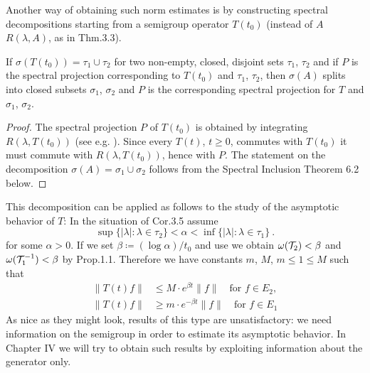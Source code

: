 Another way of obtaining such norm estimates is by constructing spectral decompositions starting from a semigroup operator $T(t_{0})$ (instead of $A$ \resp $R(\lambda,A)$, as in Thm.3.3).
\begin{corollary}\label{cor:a3-3.5}
If $\sigma(T(t_{0})) = \tau_{1} \cup \tau_{2}$ for two non-empty, closed, disjoint sets $\tau_{1}$, $\tau_{2}$ and if $P$ is the spectral projection corresponding to $T(t_{0})$ and $\tau_{1}$, $\tau_{2}$, then $\sigma(A)$ splits into closed subsets $\sigma_{1}$, $\sigma_{2}$ and $P$ is the corresponding spectral projection for $T$ and $\sigma_{1}$, $\sigma_{2}$.
\end{corollary}
\begin{proof}
The spectral projection $P$ of $T(t_{0})$ is obtained by integrating $R(\lambda,T(t_{0}))$ (see e.g. \citet[Section VII.3]{dunfordschwartz:1958}).
Since every $T(t)$, $t \geq 0$, commutes with $T(t_{0})$ it must commute with $R(\lambda,T(t_{0}))$, hence with $P$.
The statement on the decomposition $\sigma(A) = \sigma_{1} \cup \sigma_{2}$ follows from the Spectral Inclusion Theorem 6.2 below.
\end{proof}
This decomposition can be applied as follows to the study of the asymptotic behavior of $T$: In the situation of Cor.3.5 assume
\[
\sup \{|\lambda| \colon \lambda \in \tau_{2}\} < \alpha < \inf \{|\lambda| \colon \lambda \in \tau_{1}\}~.
\]
for some $\alpha > 0$. If we set $\beta \coloneqq (\log\alpha)/t_{0}$ and use \citet[Chap.I,Thm.6.5]{pazy:1983} we obtain $\omega(\mathcal{T}_{2}) < \beta$ and $\omega(\mathcal{T}_{1}^{-1}) < \beta$ by Prop.1.1.
Therefore we have constants $m$, $M$, $m \le 1 \le M $ such that
\begin{align*}
	\|T(t)f\| &\leq M \cdot e^{\beta t}\|f\| \quad \text{for } f \in E_{2}, \\
	\|T(t)f\| &\geq m \cdot e^{-\beta t}\|f\| \quad \text{for } f \in E_{1}
\end{align*}
As nice as they might look, results of this type are unsatisfactory: we need information on the semigroup in order to estimate its asymptotic behavior.
In Chapter IV we will try to obtain such results by exploiting information about the generator only.
